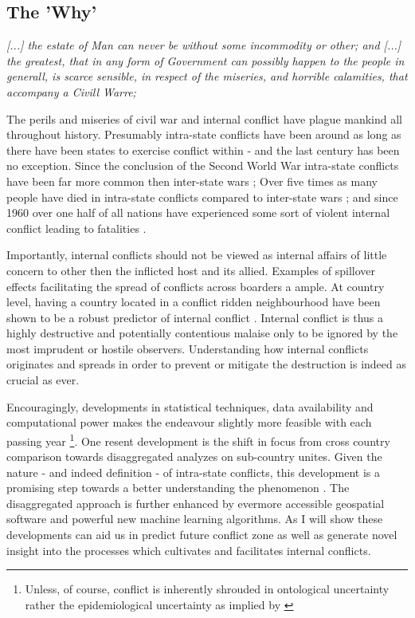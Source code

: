 \documentclass[a4paper]{article}
\begin{document}
\subsection{The 'Why'}

\begin{displayquote}
\emph{[...] the estate of Man can never be without some incommodity or other; and [...] the greatest, that in any form of Government can possibly happen to the people in generall, is scarce sensible, in respect of the miseries, and horrible calamities, that accompany a Civill Warre;} \cite[128]{Hobbes_1991}  \par

\end{displayquote}

The perils and miseries of civil war and internal conflict have plague mankind all throughout history. Presumably intra-state conflicts have been around as long as there have been states to exercise conflict within - and the last century has been no exception. Since the conclusion of the Second World War intra-state conflicts have been far more common then inter-state wars \citep[563]{Collier_Hoeffler_2004}; Over five times as many people have died in intra-state conflicts compared to inter-state wars \citep[563]{Collier_Hoeffler_2004}; and since 1960 over one half of all nations have experienced some sort of violent internal conflict leading to fatalities \citep[3-4]{Blattman_Miguel_2010}.\par

Importantly, internal conflicts should not be viewed as internal affairs of little concern to other then the inflicted host and its allied. Examples of spillover effects facilitating the spread of conflicts across boarders a ample. At country level, having a country located in a conflict ridden neighbourhood have been shown to be a robust predictor of internal conflict \citep{Hegre_Sambanis_2006,Goldstone_2010}. Internal conflict is thus a highly destructive and potentially contentious malaise only to be ignored by the most imprudent or hostile observers. Understanding how internal conflicts originates and spreads in order to prevent or mitigate the destruction is indeed as crucial as ever.\par

Encouragingly, developments in statistical techniques, data availability and computational power makes the endeavour slightly more feasible with each passing year \footnote{Unless, of course, conflict is inherently shrouded in ontological uncertainty rather the epidemiological uncertainty as implied by \cite{Gartzke_1999}}. One resent development is the shift in focus from cross country comparison towards disaggregated analyzes on sub-country unites. Given the nature - and indeed definition - of intra-state conflicts, this development is a promising step towards a better understanding the phenomenon \citep{Cederman_Gleditsch_2009}. The disaggregated approach is further enhanced by evermore accessible geospatial software and powerful new machine learning algorithms. As I will show these developments can aid us in predict future conflict zone as well as generate novel insight into the processes which cultivates and facilitates internal conflicts.\par
\end{document}
